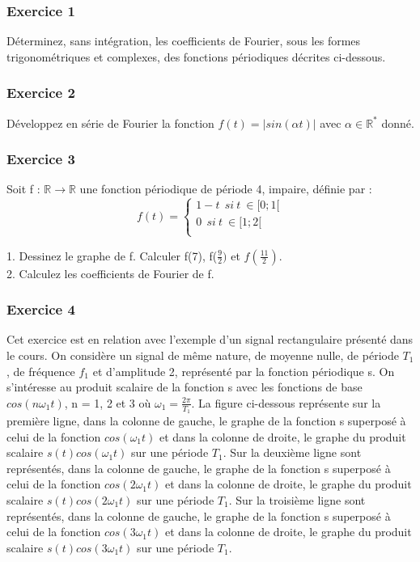 	\subsubsection{Exercice 1}
	Déterminez, sans intégration, les coefficients de Fourier, sous les formes trigonométriques et complexes, des fonctions périodiques décrites ci-dessous.\\
	
	\subsubsection{Exercice 2}
	Développez en série de Fourier la fonction $f(t)=|sin(\alpha t)|$ avec $\alpha \in \mathbb{R^{*}}$ donné.\\
	
	\subsubsection{Exercice 3}
	Soit f : $\mathbb{R} \rightarrow \mathbb{R}$ une fonction périodique de période 4, impaire, définie par :
	\begin{equation*}
	f(t)=\left \{
	\begin{array}{l}
	1-t~~si~t~\in[0;1[ \\
	0~~si~t~\in[1;2[ \\
	\end{array}
	\right .
	\end{equation*}
	
	1. Dessinez le graphe de f. Calculer f(7), f($\frac{9}{2})$ et $f(\frac{11}{2})$.\\
	2. Calculez les coefficients de Fourier de f.\\
	
	\subsubsection{Exercice 4}
	Cet exercice est en relation avec l'exemple d'un signal rectangulaire présenté dans le cours. On considère un signal de même nature, de moyenne nulle, de période $T_1$, de fréquence $f_1$ et	d'amplitude 2, représenté par la fonction périodique s. On s'intéresse au produit scalaire de la fonction s avec les fonctions de base $cos(n\omega_{1}t)$, n = 1, 2 et 3 où $\omega_{1} = \frac{2\pi}{T_1}$. La figure ci-dessous représente sur la première ligne, dans la colonne de gauche, le graphe de la fonction s superposé à celui de	la fonction $cos(\omega_{1}t)$ et dans la colonne de droite, le graphe du produit scalaire $s(t)cos(\omega_{1}t)$ sur
	une période $T_1$. Sur la deuxième ligne sont représentés, dans la colonne de gauche, le graphe de la fonction s superposé à celui de la fonction $cos(2\omega_{1}t)$ et dans la colonne de droite, le graphe	du produit scalaire $s(t)cos(2\omega_{1}t)$ sur une période $T_1$. Sur la troisième ligne sont représentés,
	dans la colonne de gauche, le graphe de la fonction s superposé à celui de la fonction  $cos(3\omega_{1}t)$	et dans la colonne de droite, le graphe du produit scalaire $s(t)cos(3\omega_{1}t)$ sur une période $T_1$. 
	
